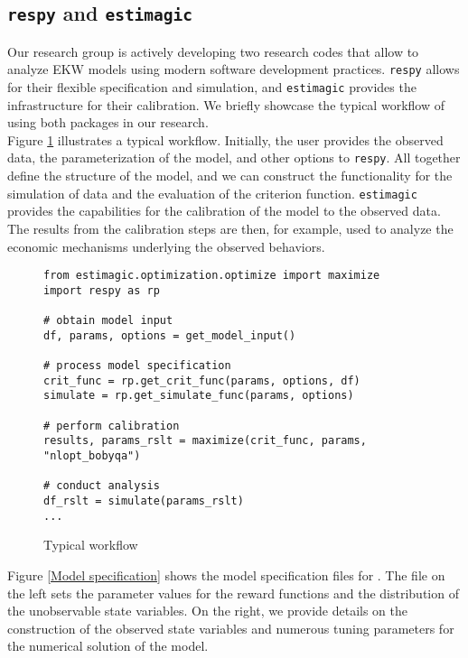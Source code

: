 \subsection{\texttt{respy} and \texttt{estimagic}}
Our research group is actively developing two research codes that allow to analyze EKW models using modern software development practices. \verb+respy+ allows for their flexible specification and simulation, and \verb+estimagic+ provides the infrastructure for their calibration. We briefly showcase the typical workflow of using both packages in our research.\\

\noindent Figure \ref{Typical workflow} illustrates a typical workflow. Initially, the user provides the observed data, the parameterization of the model, and other options to \verb+respy+. All together define the structure of the model, and we can construct the functionality for the simulation of data and the evaluation of the criterion function. \verb+estimagic+ provides the capabilities for the calibration of the model to the observed data. The results from the calibration steps are then, for example, used to analyze the economic mechanisms underlying the observed behaviors.

\begin{figure}[ht!]\centering
\caption{Typical workflow}\label{Typical workflow}
\begin{lstlisting}
from estimagic.optimization.optimize import maximize
import respy as rp

# obtain model input
df, params, options = get_model_input()

# process model specification
crit_func = rp.get_crit_func(params, options, df)
simulate = rp.get_simulate_func(params, options)

# perform calibration
results, params_rslt = maximize(crit_func, params, "nlopt_bobyqa")

# conduct analysis
df_rslt = simulate(params_rslt)
...

\end{lstlisting}
\end{figure}\FloatBarrier

\noindent Figure \ref{Model specification} shows the model specification files for \citet{Keane.1994}. The file on the left sets the parameter values for the reward functions and the distribution of the unobservable state variables. On the right, we provide details on the construction of the observed state variables and numerous tuning parameters for the numerical solution of the model.

